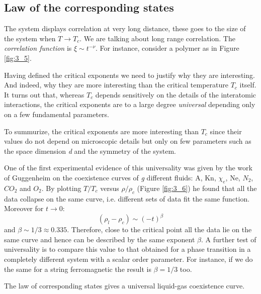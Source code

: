 \documentclass[../main/main.tex]{subfiles}
\begin{document}
\subsection{Law of the corresponding states}
The system displays correlation at very long distance, these goes to the size of the system when \( T \rightarrow T_c \). We are talking about long range correlation. The \emph{correlation function} is \( \xi \sim t^{-\nu } \).
For instance, consider a polymer as in Figure \ref{fig:3_5}.

Having defined the critical exponents we need to justify why they are interesting. And indeed, why they are more interesting than the critical temperature \( T_c \) itself. It turns out that, whereas \( T_c \) depends sensitively on the details of the interatomic interactions, the critical exponents are to a large degree \emph{universal} depending only on a few fundamental parameters.

To summurize, the critical exponents are more interesting than \( T_c \) since their values do not depend on microscopic details but only on few parameters such as the space dimension \emph{d} and the symmetry of the system.

One of the first experimental evidence of this universality was given by the work of Guggenheim on the coexistence curves of \emph{g} different fluids: A, Kn, $\chi_e$, Ne, $N_2$, $CO_2$ and $O_2$. By plotting \( T/T_c \) versus \( \rho /\rho _c \) (Figure \ref{fig:3_6}) he found that all the data collapse on the same curve, i.e. different sets of data fit the  same function. Moreover for \( t \rightarrow 0 \):
\begin{equation}
  (\rho _l - \rho _c) \sim (-t)^{\beta}
  \label{eq:}
\end{equation}
and \( \beta \sim 1/3 \approx 0.335 \).  Therefore, close to the critical point all the data lie on the same curve and hence can be described by the same exponent \( \beta  \).
A further test of universality is to compare this value to that obtained for a phase transition in a completely different system with a scalar order parameter. For instance, if we do the same for a string ferromagnetic the result is \( \beta = 1/3 \)  too.
\begin{remark}
The law of corresponding states gives a universal liquid-gas coexistence curve.
\end{remark}
\end{document}
